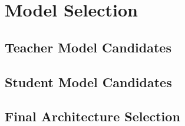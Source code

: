 \section{Model Selection}\label{sec:model_selection}

\subsection{Teacher Model Candidates}

\subsection{Student Model Candidates}

\subsection{Final Architecture Selection}
